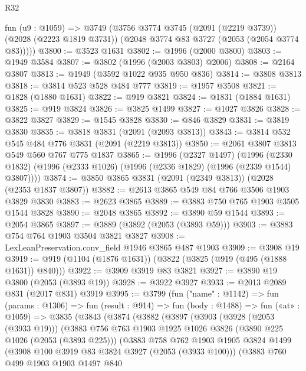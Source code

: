 \begin{lexlean}{R32}
\begin{coremodule}
    fun (u9 : @1059) =>
    @3749
      (@3756
        @3774
        @3745
        (@2091 (@2219 @3739))
        (@2028 (@2223 @1819 @3731))
        (@2048 @3774 @83 @3727 (@2053 (@2054 @3774 @83)))))
@3800 := @3523 @1631
@3802 := @1996 (@2000 @3800)
@3803 := @1949 @3584
@3807 := @3802 (@1996 (@2003 @3803) @2006)
@3808 := @2164 @3807
@3813 := @1949 (@3592 @1022 @935 @950 @836)
@3814 := @3808 @3813
@3818 := @3814 @523 @528 @484 @777
@3819 := @1957 @3508
@3821 := @1828 (@1880 @1631)
@3822 := @919 @3821
@3824 := @1831 (@1884 @1631)
@3825 := @919 @3824
@3826 := @3825 @1499
@3827 := @1027 @3826
@3828 := @3822 @3827
@3829 := @1545 @3828
@3830 := @846 @3829
@3831 := @3819 @3830
@3835 := @3818 @3831 (@2091 (@2093 @3813))
@3843 := @3814 @532 @545 @484 @776 @3831 (@2091 (@2219 @3813))
@3850 := @2061 @3807 @3813 @549 @560 @767 @775 @1837
@3865 := @1996
    (@2327 @1497)
    (@1996 (@2330 @1832) (@1996 (@2333 @1026) (@1996 (@2336 @1829) (@1996 (@2339 @1544) @3807))))
@3874 := @3850 @3865 @3831 (@2091 (@2349 @3813)) (@2028 (@2353 @1837 @3807))
@3882 := @2613 @3865 @549 @84 @766 @3506 @1903 @3829 @3830
@3883 := @2623 @3865
@3889 := @3883 @750 @765 @1903 @3505 @1544 @3828
@3890 := @2048 @3865
@3892 := @3890 @59 @1544
@3893 := @2054 @3865
@3897 := @3889 (@3892 (@2053 (@3893 @59)))
@3903 := @3883 @754 @764 @1903 @3504 @3821 @3827
@3908 := LexLeanPreservation.conv_field @1946 @3865 @487 @1903
@3909 := @3908 @19
@3919 := @919 (@1104 (@1876 @1631)) (@3822 (@3825 (@919 (@495 (@1888 @1631)) @840)))
@3922 := @3909 @3919 @83 @3821
@3927 := @3890 @19 @3800 (@2053 (@3893 @19))
@3928 := @3922 @3927
@3933 := @2013 @2089 @831 (@2017 @831) @3919
@3995 := @3799
    (fun ("name" : @1142) =>
    fun (params : @1306) =>
    fun (result : @914) =>
    fun (body : @1488) =>
    fun («at» : @1059) =>
    @3835
      (@3843
        (@3874
          (@3882
            (@3897
              (@3903
                (@3928 (@2053 (@3933 @19)))
                (@3883
                  @756
                  @763
                  @1903
                  @1925
                  @1026
                  @3826
                  (@3890 @225 @1026 (@2053 (@3893 @225)))
                  (@3883
                    @758
                    @762
                    @1903
                    @1905
                    @3824
                    @1499
                    (@3908 @100 @3919 @83 @3824 @3927 (@2053 (@3933 @100)))
                    (@3883
                      @760
                      @499
                      @1903
                      @1903
                      @1497
                      @840

\end{coremodule}
\end{lexlean}
